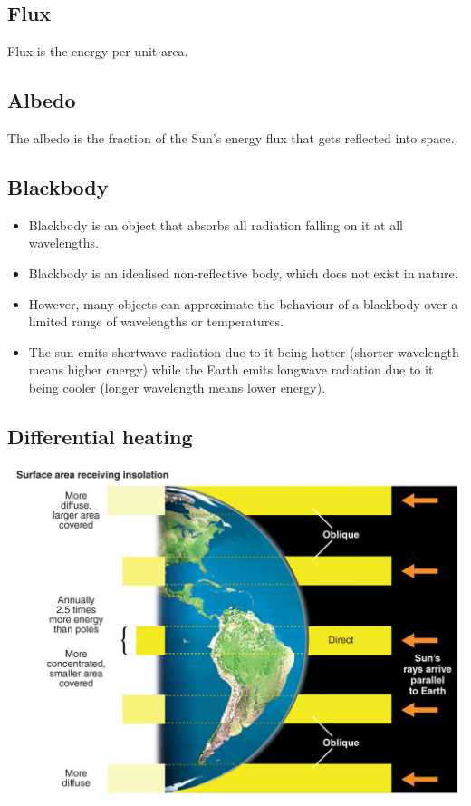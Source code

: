 \documentclass[11pt]{article}
\begin{document}
\subsection{Flux}
\label{sec:org4d7db5c}
Flux is the energy per unit area.

\subsection{Albedo}
\label{sec:org6c82593}
The albedo is the fraction of the Sun's energy flux that gets reflected into space.

\newpage

\subsection{Blackbody}
\label{sec:org7712d88}
\begin{itemize}
\item Blackbody is an object that absorbs all radiation falling on it at all wavelengths.
\item Blackbody is an idealised non-reflective body, which does not exist in nature.
\item However, many objects can approximate the behaviour of a blackbody over a limited range of wavelengths or temperatures.
\item The sun emits shortwave radiation due to it being hotter (shorter wavelength means higher energy) while the Earth emits longwave radiation due to it being cooler (longer wavelength means lower energy).
\end{itemize}

\subsection{Differential heating}
\label{sec:orgd2aeba6}
\begin{center}
\includegraphics[width=.9\linewidth]{./images/differential-heating.png}
\end{center}
\end{document}
